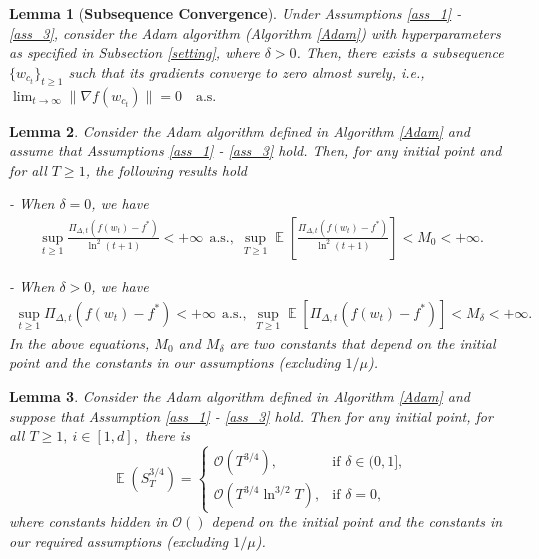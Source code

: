 \documentclass{article} %
\newtheorem{lemma}{Lemma}[section]
\DeclareMathOperator{\Expect}{\mathbb{E}}
\begin{document}
\begin{lemma}[\textbf{Subsequence Convergence}]\label{sub}
Under Assumptions \ref{ass_1} - \ref{ass_3}, consider the Adam algorithm (Algorithm \ref{Adam}) with hyperparameters as specified in Subsection \ref{setting}, where \( \delta > 0 \). Then, there exists a subsequence \( \{w_{c_{t}}\}_{t \geq 1} \) such that its gradients converge to zero almost surely, i.e.,
\(
\lim_{t \to \infty} \|\nabla f(w_{c_t})\| = 0 \quad \text{a.s.}
\)
\end{lemma}

\begin{lemma}\label{lem_g}
Consider the Adam algorithm defined in Algorithm \ref{Adam} and assume that Assumptions \ref{ass_1} - \ref{ass_3} hold. Then, for any initial point and for all $T \geq 1$, the following results hold

- When $\delta = 0$, we have
\begin{align*}
   \sup_{t \geq 1} \frac{\Pi_{\Delta, t} (f(w_{t})-f^*)}{\ln^{2}(t+1)} < +\infty \ \ \text{a.s.,} \ \ \sup_{T \geq 1} \Expect\left[ \frac{\Pi_{\Delta, t} (f(w_{t})-f^*)}{\ln^{2}(t+1)} \right] < M_{0} < +\infty.
\end{align*}

- When $\delta > 0$, we have
\begin{align*}
   \sup_{t \geq 1} \Pi_{\Delta, t} (f(w_{t})-f^*) < +\infty \ \ \text{a.s.,} \ \ \sup_{T \geq 1} \Expect\left[ \Pi_{\Delta, t} (f(w_{t})-f^*) \right] < M_{\delta} < +\infty.
\end{align*}
In the above equations, $M_{0}$ and $M_{\delta}$ are two constants that depend on the initial point and the constants in our assumptions (excluding $1/\mu$).
\end{lemma}

\begin{lemma}\label{lem_S_T}
Consider the Adam algorithm defined in Algorithm \ref{Adam} and suppose that Assumption \ref{ass_1} - \ref{ass_3} hold. Then for any initial point, for all $T\ge 1,\ i\in[1,d],$ there is
\[\Expect({S^{3/4}_{T}})=\begin{cases} 
\mathcal{O}({T^{3/4}}), & \text{if } \delta \in (0,1], \\
\mathcal{O}({T^{3/4}}\ln^{3/2} T), & \text{if } \delta = 0,
\end{cases}\]
where constants hidden in $\mathcal{O}()$ depend on the initial point and the constants in our required assumptions (excluding $1/\mu$).
\end{lemma}
\end{document}
